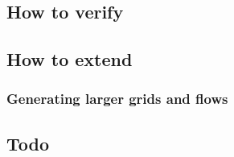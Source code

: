 \subsection{How to verify}
\subsection{How to extend}
\subsubsection{Generating larger grids and flows}
\subsection{Todo}